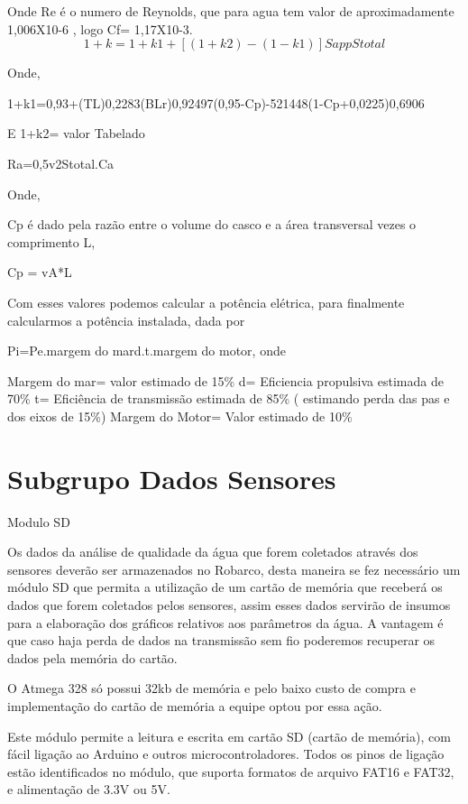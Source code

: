 Onde Re é o numero de Reynolds, que para agua tem valor de aproximadamente 1,006X10-6 , logo Cf= 1,17X10-3.
\begin{equation}
	1+k=1+k1+[(1+k2)-(1-k1)]SappStotal 
\end{equation}
 

Onde, 

1+k1=0,93+(TL)0,2283(BLr)0,92497(0,95-Cp)-521448(1-Cp+0,0225)0,6906

E 
1+k2= valor Tabelado

Ra=0,5v2Stotal.Ca

Onde, 

Cp é dado pela razão entre o  volume do casco e a área transversal vezes o comprimento L,

Cp = vA*L


Com esses valores podemos calcular a potência elétrica, para finalmente calcularmos a potência instalada, dada por

Pi=Pe.margem do mard.t.margem do motor, onde


Margem do mar= valor estimado de 15\%
d= Eficiencia propulsiva estimada de 70\%
t= Eficiência de transmissão estimada de 85\% ( estimando perda das pas e dos eixos de 15\%) 
Margem do Motor= Valor estimado de 10\%


\section{Subgrupo Dados Sensores}

Modulo SD 


Os dados da análise de qualidade da água que forem coletados através dos sensores deverão ser armazenados no Robarco, desta maneira se fez necessário um módulo SD que permita a utilização de um cartão de memória que receberá os dados que forem coletados pelos sensores, assim esses dados servirão de insumos para a elaboração dos gráficos relativos aos parâmetros da água. A vantagem é que caso haja perda de dados na transmissão sem fio poderemos recuperar os dados pela memória do cartão.

O Atmega 328 só possui 32kb de memória e pelo baixo custo de compra e implementação do cartão de memória a equipe optou por essa ação.

Este módulo permite a leitura e escrita em cartão SD (cartão de memória), com fácil ligação ao Arduino e outros microcontroladores. Todos os pinos de ligação estão identificados no módulo, que suporta formatos de arquivo FAT16 e FAT32, e alimentação de 3.3V ou 5V.

